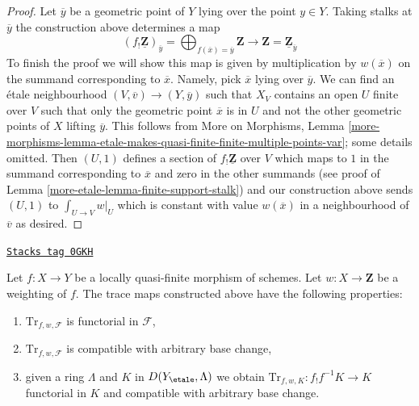 \begin{proof}
\medskip\noindent
Let $\overline{y}$ be a geometric point of $Y$ lying over the point $y \in Y$.
Taking stalks at $\overline{y}$ the construction above determines a map
$$
(f_!\underline{\mathbf{Z}})_{\overline{y}}
= \bigoplus\nolimits_{f(\overline{x}) = \overline{y}} \mathbf{Z}
\longrightarrow
\mathbf{Z} = \underline{\mathbf{Z}}_{\overline{y}}
$$
To finish the proof we will show this map is given by multiplication by
$w(\overline{x})$ on the summand corresponding to $\overline{x}$.
Namely, pick $\overline{x}$ lying over $\overline{y}$.
We can find an \'etale neighbourhood $(V, \overline{v}) \to (Y, \overline{y})$
such that $X_V$ contains an open $U$ finite over $V$
such that only the geometric point $\overline{x}$ is in $U$
and not the other geometric points of $X$ lifting $\overline{y}$.
This follows from More on Morphisms, Lemma
\ref{more-morphisms-lemma-etale-makes-quasi-finite-finite-multiple-points-var};
some details omitted. Then $(U, 1)$ defines a section of
$f_!\underline{\mathbf{Z}}$ over $V$ which maps to $1$ in the summand
corresponding to $\overline{x}$ and zero in the other summands
(see proof of Lemma \ref{more-etale-lemma-finite-support-stalk}) and
our construction above sends $(U, 1)$ to $\int_{U \to V} w|_U$
which is constant with value $w(\overline{x})$ in a neighbourhood
of $\overline{v}$ as desired.
\end{proof}

\begin{lemma}
\label{more-etale-lemma-properties-trace-map}
\href{https://stacks.math.columbia.edu/tag/0GKH}{\texttt{Stacks tag 0GKH}}

Let $f : X \to Y$ be a locally quasi-finite morphism of schemes.
Let $w : X \to \mathbf{Z}$ be a weighting of $f$. The trace maps
constructed above have the following properties:
\begin{enumerate}
\item $\text{Tr}_{f, w, \mathcal{F}}$ is functorial in $\mathcal{F}$,
\item $\text{Tr}_{f, w, \mathcal{F}}$ is compatible with arbitrary base change,
\item given a ring $\Lambda$ and $K$ in $D(Y_\etale, \Lambda)$
we obtain $\text{Tr}_{f, w, K} : f_!f^{-1}K \to K$ functorial in $K$
and compatible with arbitrary base change.
\end{enumerate}
\end{lemma}

